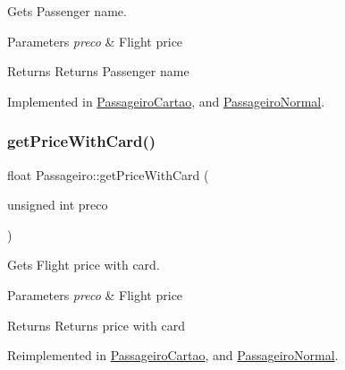 Gets Passenger name. 


\begin{DoxyParams}{Parameters}
{\em preco} & Flight price\\
\hline
\end{DoxyParams}
\begin{DoxyReturn}{Returns}
Returns Passenger name 
\end{DoxyReturn}


Implemented in \hyperlink{class_passageiro_cartao_a5323cda881d4ed94680f7c4e654a7456}{Passageiro\+Cartao}, and \hyperlink{class_passageiro_normal_a09b0c8bc050ba663965559e94f5c5d1d}{Passageiro\+Normal}.

\mbox{\label{class_passageiro_ad2477f9716b82c3ffbcdfca5bb776679}} 
\subsubsection{\texorpdfstring{get\+Price\+With\+Card()}{getPriceWithCard()}}
{\footnotesize\ttfamily float Passageiro\+::get\+Price\+With\+Card (\begin{DoxyParamCaption}\item[{unsigned int}]{preco }\end{DoxyParamCaption})\hspace{0.3cm}{\ttfamily [virtual]}}



Gets Flight price with card. 


\begin{DoxyParams}{Parameters}
{\em preco} & Flight price\\
\hline
\end{DoxyParams}
\begin{DoxyReturn}{Returns}
Returns price with card 
\end{DoxyReturn}


Reimplemented in \hyperlink{class_passageiro_cartao_a2bd1b79ef18e3289545386a8740b1136}{Passageiro\+Cartao}, and \hyperlink{class_passageiro_normal_a8932fec94ce61c2488b51c90955f3d34}{Passageiro\+Normal}.

\mbox{\label{class_passageiro_a922b6669669a6e2af2328606013a3a6b}} 
